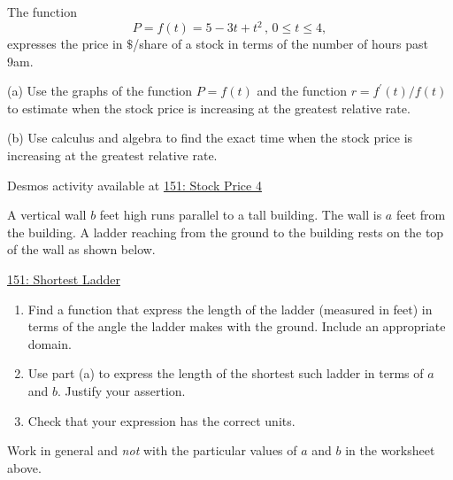 \documentclass{ximera}
\begin{document}
\begin{question}  \label{Q:dfgtdftrtnhy}
The function 
\[
      P = f(t) = 5 -3t + t^2 \, , \, 0\leq t \leq 4 , 
\]
expresses the price in $\$$/share of a stock in terms of the number of hours past 9am.

(a) Use the graphs of the function $P=f(t)$ and the function $r=f^\prime(t)/f(t)$  to estimate when the stock price is increasing at the greatest relative rate.

(b) Use calculus and algebra to find the exact time when the stock price is increasing at the greatest relative rate.



\begin{onlineOnly}
    \begin{center}
\end{center}
\end{onlineOnly}

Desmos activity available at \href{https://www.desmos.com/calculator/y78fnyy7s3}{151: Stock Price 4}

\end{question}






\begin{question}  \label{Q0t0gogppdga}

A vertical wall $b$ feet high runs parallel to a tall building. The wall is $a$ feet from the building. A ladder reaching from the ground to the building rests on the top of the wall as shown below.

\begin{onlineOnly}
   \begin{center}
\end{center}
\end{onlineOnly}

\href{https://www.desmos.com/calculator/4ak46ub8ay}{151: Shortest Ladder}


\begin{enumerate}
\item Find a function that express the length of the ladder (measured in feet) in terms of the angle the ladder makes with the ground. Include an appropriate domain.

\item Use part (a) to express the length of the shortest such ladder in terms of $a$ and $b$. Justify your assertion. 

\item Check that your expression has the correct units.

\end{enumerate}

Work in general and \emph{not} with the particular values of $a$ and $b$ in the worksheet above.

\end{question} 
\end{document}
